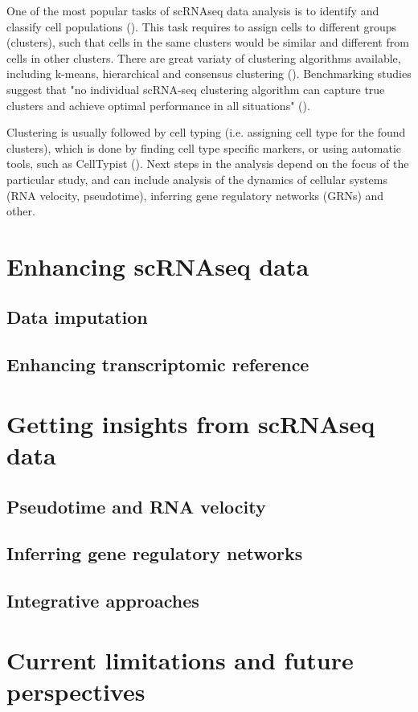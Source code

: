 One of the most popular tasks of scRNAseq data analysis is to identify and classify cell populations (\cite{Andrews2018}).
This task requires to assign cells to different groups (clusters),
such that cells in the same clusters would be similar and different from cells in other clusters.
There are great variaty of clustering algorithms available,
including k-means, hierarchical and consensus clustering (\cite{Peng2020}).
Benchmarking studies suggest that "no individual scRNA-seq clustering algorithm can capture true clusters and achieve
optimal performance in all situations" (\cite{Peng2020}).

Clustering is usually followed by cell typing (i.e. assigning cell type for the found clusters),
which is done by finding cell type specific markers, or using automatic tools, such as CellTypist (\cite{Dom2022}).
Next steps in the analysis depend on the focus of the particular study, and can include
analysis of the dynamics of cellular systems (RNA velocity, pseudotime),
inferring gene regulatory networks (GRNs) and other.

\section{Enhancing scRNAseq data}

\subsection{Data imputation}

\subsection{Enhancing transcriptomic reference}

\section{Getting insights from scRNAseq data}

\subsection{Pseudotime and RNA velocity}

\subsection{Inferring gene regulatory networks}

\subsection{Integrative approaches}

\section{Current limitations and future perspectives}

